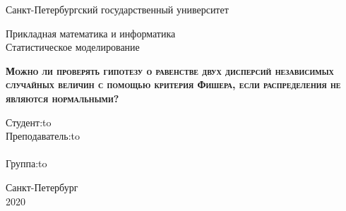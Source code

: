 \documentclass[12pt]{disser}
\begin{document}
\begin{titlepage}
	\newpage
	
	\begin{center}
	 Санкт-Петербургский государственный университет \\
	 
	\end{center}
	
	\vspace{8em}
	
	\begin{center}
		\Large Прикладная математика и информатика \\ Статистическое моделирование \\ 
	\end{center}
	
	\vspace{2em}
	
	\begin{center}
		\textsc{\textbf{Можно ли проверять гипотезу о равенстве двух дисперсий независимых случайных величин с помощью критерия Фишера, если распределения не являются нормальными?}}
	\end{center}
	
	\vspace{13em}
	
	
	
	\newbox{\lbox}
	\newlength{\maxl}
	\setlength{\maxl}{\wd\lbox}
	\hfill\parbox{11cm}{
		\hspace*{5cm}\hspace*{-5cm}Студент:\hfill\hbox to\\
		\hspace*{5cm}\hspace*{-5cm}Преподаватель:\hfill\hbox to\\
		\\
		\hspace*{5cm}\hspace*{-5cm}Группа:\hfill\hbox to\\
	}
	
	
	\vspace{\fill}
	
	\begin{center}
		Санкт-Петербург \\2020
	\end{center}
	
\end{titlepage}
\end{document}
